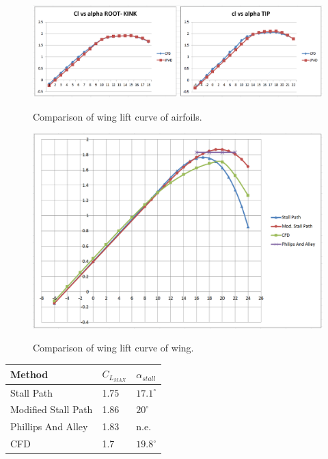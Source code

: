 \begin{figure}[H]
	\centering
	{\includegraphics[height=4.9 cm]{Immagini/comparisonairfoil.png}} 
	\caption{Comparison of wing lift curve of airfoils.}
	\label{fig:met}
\end{figure}
	 	 


	 	 
\begin{figure}[H]
	\centering
	{\includegraphics[height=9 cm]{Immagini/clmaxcomparison}} 
	\caption{Comparison of wing lift curve of wing.}
	\label{fig:met}
\end{figure}
	 	 
	 	 
\begin{center}
	\begin{tabular}{| l | l | l |}
		\hline
		 Method  & $C_{L_{MAX}}$ & $\alpha_{stall}$   \\ \hline
		 Stall Path  & 1.75  & $17.1 ^{\circ}$  \\ \hline
		 Modified Stall Path  & 1.86   & $20 ^{\circ}$  \\ \hline
		 Phillips And Alley  & 1.83  & n.e.\\ \hline
		 CFD  & 1.7  & $19.8 ^{\circ}$   \\ \hline
		\hline
	\end{tabular}
\end{center}

